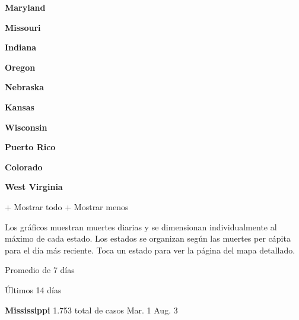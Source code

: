 \textbf{Maryland}

\href{https://www.nytimes3xbfgragh.onion/interactive/2020/us/missouri-coronavirus-cases.html}{}

\textbf{Missouri}

\href{https://www.nytimes3xbfgragh.onion/interactive/2020/us/indiana-coronavirus-cases.html}{}

\textbf{Indiana}

\href{https://www.nytimes3xbfgragh.onion/interactive/2020/us/oregon-coronavirus-cases.html}{}

\textbf{Oregon}

\href{https://www.nytimes3xbfgragh.onion/interactive/2020/us/nebraska-coronavirus-cases.html}{}

\textbf{Nebraska}

\href{https://www.nytimes3xbfgragh.onion/interactive/2020/us/kansas-coronavirus-cases.html}{}

\textbf{Kansas}

\href{https://www.nytimes3xbfgragh.onion/interactive/2020/us/wisconsin-coronavirus-cases.html}{}

\textbf{Wisconsin}

\href{https://www.nytimes3xbfgragh.onion/interactive/2020/us/puerto-rico-coronavirus-cases.html}{}

\textbf{Puerto Rico}

\href{https://www.nytimes3xbfgragh.onion/interactive/2020/us/colorado-coronavirus-cases.html}{}

\textbf{Colorado}

\href{https://www.nytimes3xbfgragh.onion/interactive/2020/us/west-virginia-coronavirus-cases.html}{}

\textbf{West Virginia}

+ Mostrar todo + Mostrar menos

Los gráficos muestran muertes diarias y se dimensionan individualmente
al máximo de cada estado. Los estados se organizan según las muertes per
cápita para el día más reciente. Toca un estado para ver la página del
mapa detallado.

\href{https://www.nytimes3xbfgragh.onion/interactive/2020/us/mississippi-coronavirus-cases.html}{}

Promedio de 7 días

Últimos 14 días

\textbf{Mississippi} 1.753 total de casos Mar. 1 Aug. 3

\href{https://www.nytimes3xbfgragh.onion/interactive/2020/us/florida-coronavirus-cases.html}{}

